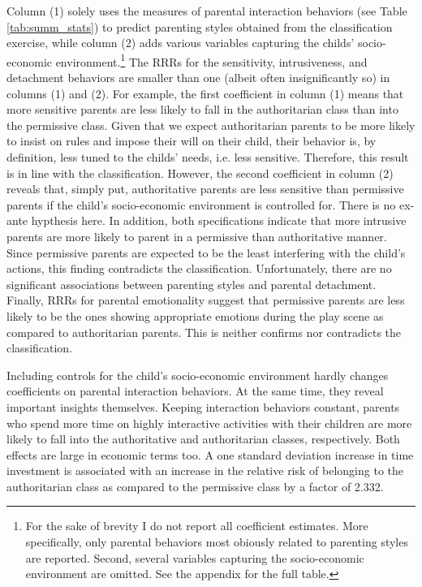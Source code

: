 %
Column (1) solely uses the measures of parental interaction behaviors (see Table \ref{tab:summ_stats}) to predict parenting styles obtained from the classification exercise, while column (2) adds various variables capturing the childs' socio-economic environment.\footnote{
For the sake of brevity I do not report all coefficient estimates. More specifically, only parental behaviors most obiously related to parenting styles are reported. Second, several variables capturing the socio-economic environment are omitted. See the appendix for the full table.
} 
The RRRs for the sensitivity, intrusiveness, and detachment behaviors are smaller than one (albeit often insignificantly so) in columns (1) and (2). For example, the first coefficient in column (1) means that more sensitive parents are less likely to fall in the authoritarian class than into the permissive class. Given that we expect authoritarian parents to be more likely to insist on rules and impose their will on their child, their behavior is, by definition, less tuned to the childs' needs, i.e. less sensitive. Therefore, this result is in line with the classification. However, the second coefficient in column (2) reveals that, simply put, authoritative parents are less sensitive than permissive parents if the child's socio-economic environment is controlled for. There is no ex-ante hypthesis here.
%
In addition, both specifications indicate that more intrusive parents are more likely to parent in a permissive than authoritative manner. Since permissive parents are expected to be the least interfering with the child's actions, this finding contradicts the classification. Unfortunately, there are no significant associations between parenting styles and parental detachment. Finally, RRRs for parental emotionality suggest that permissive parents are less likely to be the ones showing appropriate emotions during the play scene as compared to authoritarian parents. This is neither confirms nor contradicts the classification.

Including controls for the child's socio-economic environment hardly changes coefficients on parental interaction behaviors. At the same time, they reveal important insights themselves. Keeping interaction behaviors constant, parents who spend more time on highly interactive activities with their children are more likely to fall into the authoritative and authoritarian classes, respectively. Both effects are large in economic terms too. A one standard deviation increase in time investment is associated with an increase in the relative risk of belonging to the authoritarian class as compared to the permissive class by a factor of 2.332.

